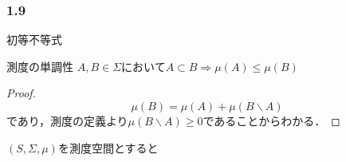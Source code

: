 \documentclass{jsarticle}
\begin{document}
\subsubsection*{1.9}
初等不等式

\begin{itembox}[l]{測度の単調性}
    $A,B\in \Sigma$において$A\subset B\Rightarrow\mu(A)\leq\mu(B)$
    \begin{proof}
        \begin{equation}
            \mu(B)=\mu(A)+\mu(B\backslash A)
        \end{equation}
        であり，測度の定義より$\mu(B\backslash A)\geq 0$であることからわかる．
    \end{proof}
\end{itembox}

$(S,\Sigma,\mu)$を測度空間とすると
\end{document}
